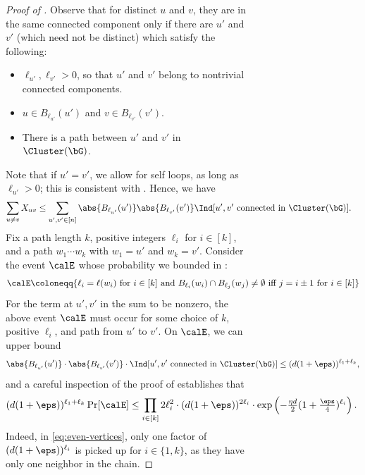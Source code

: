 \documentclass[11pt,letterpaper]{article}
\begin{document}
\begin{figure}
\begin{figure}
\begin{proof}[Proof of ]
    Observe that for distinct $u$ and $v$, they are in the same connected component only if there are $u'$ and $v'$ (which need not be distinct) which satisfy the following:
    \begin{itemize}
        \item $\ell_{u'}, \ell_{v'} > 0$, so that $u'$ and $v'$ belong to nontrivial connected components.
        \item $u \in B_{\ell_{u'}}(u')$ and $v \in B_{\ell_{v'}}(v')$.
        \item There is a path between $u'$ and $v'$ in $\Cluster(\bG)$. 
    \end{itemize}
    Note that if $u' = v'$, we allow for self loops, as long as $\ell_{u'} > 0$; this is consistent with .
    Hence, we have 
    \begin{align*}
        \sum_{u \neq v} X_{uv} &\le \sum_{u', v' \in [n]} \abs{B_{\ell_{u'}}(u')} \abs{B_{\ell_{v'}}(v')} \Ind[u', v' \text{ connected in } \Cluster(\bG)].
    \end{align*}
    Fix a path length $k$, positive integers $\ell_i$ for $i \in [k]$, and a path $w_1\cdots w_k$ with $w_1 = u'$ and $w_k = v'$.
    Consider the event $\calE$ whose probability we bounded in :
    \[
        \calE \coloneqq \{\ell_i = \ell(w_i) \text{ for $i \in [k]$ and } B_{\ell_i}(w_i) \cap B_{\ell_{j}}(w_{j}) \ne \emptyset \text{ iff $j = i \pm 1$ for $i \in [k]$}\}
    \]
    For the term at $u', v'$ in the sum to be nonzero, the above event $\calE$ must occur for some choice of $k$, positive $\ell_i$, and path from $u'$ to $v'$. 
    On $\calE$, we can upper bound 
    \[
        \abs{B_{\ell_{u'}}(u')} \cdot \abs{B_{\ell_{v'}}(v')} \cdot \Ind[u', v' \text{ connected in } \Cluster(\bG)] \le (d(1+\eps))^{\ell_1 + \ell_k},
    \]
    and a careful inspection of the proof of  establishes that
    \begin{align*}
        (d(1+\eps))^{\ell_1 + \ell_k}\Pr[\calE] \le \prod_{i \in [k]} 2\ell_i^2 \cdot (d(1+\eps))^{2\ell_i} \cdot \exp\left(-\tfrac{\eta d}{2}(1+\tfrac{\eps}{4})^{\ell_i}\right).
    \end{align*}
    Indeed, in \eqref{eq:even-vertices}, only one factor of $(d(1+\eps))^{\ell_i}$ is picked up for $i \in \{1, k\}$, as they have only one neighbor in the chain. 


\end{proof}
\end{figure}
\end{figure}
\end{document}
